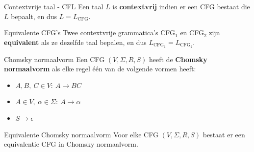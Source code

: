 \newpage

\begin{theo}{Contextvrije taal - CFL}
    Een taal $L$ is \textbf{contextvrij} indien er een CFG bestaat die $L$ bepaalt, en dus $L = L_{\text{CFG}}$.
\end{theo}

\begin{theo}{Equivalente CFG's}
    Twee contextvrije grammatica's CFG$_1$ en CFG$_2$ zijn \textbf{equivalent} als ze dezelfde taal bepalen, en dus $L_{\text{CFG}_1} = L_{\text{CFG}_2}$.
\end{theo}

\begin{theo}{Chomsky normaalvorm}
    Een CFG $(V, \Sigma, R, S)$ heeft de \textbf{Chomsky normaalvorm} als elke regel één van de volgende vormen heeft:
    \begin{itemize}
        \item $A,B, \ C \in V: \ A \to BC$
        \item $A \in V, \ \alpha \in \Sigma: \ A \to \alpha$ 
        \item $S \to \epsilon$
    \end{itemize}
    \vspace{-0.3cm}
\end{theo}

\begin{lem}{Equivalente Chomsky normaalvorm}
    Voor elke CFG $(V, \Sigma, R, S)$ bestaat er een equivalentie CFG in Chomsky normaalvorm.
\end{lem}

\newpage

